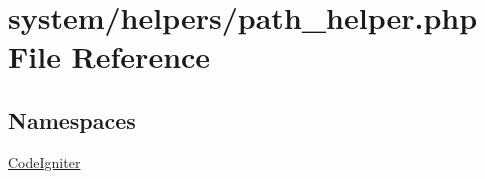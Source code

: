 \hypertarget{path__helper_8php}{\section{system/helpers/path\-\_\-helper.php File Reference}
\label{path__helper_8php}
}
\subsection*{Namespaces}
\begin{DoxyCompactItemize}
\item 
\hyperlink{namespace_code_igniter}{Code\-Igniter}
\end{DoxyCompactItemize}
